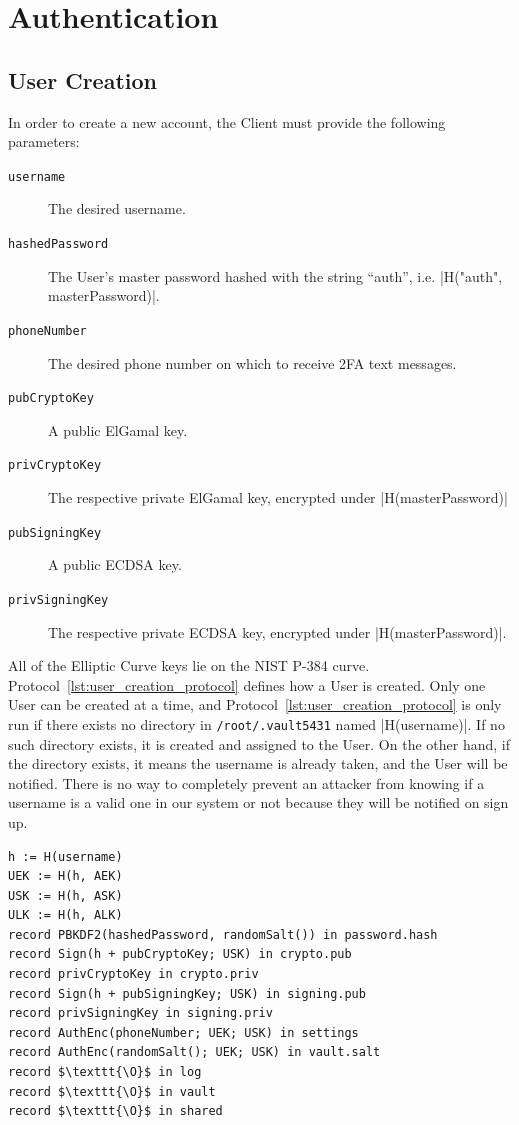 \documentclass{article}
\begin{document}
\section{Authentication}

\subsection{User Creation}
\label{sub:user_creation}
\par In order to create a new account, the Client must provide the following parameters:
\begin{description}
  \item[\texttt{username}] The desired username.
  \item[\texttt{hashedPassword}] The User's master password hashed with the string ``auth'', i.e. |H("auth", masterPassword)|.
  \item[\texttt{phoneNumber}] The desired phone number on which to receive 2FA text messages.
  \item[\texttt{pubCryptoKey}] A public ElGamal key.
  \item[\texttt{privCryptoKey}] The respective private ElGamal key, encrypted under |H(masterPassword)|
  \item[\texttt{pubSigningKey}] A public ECDSA key.
  \item[\texttt{privSigningKey}] The respective private ECDSA key, encrypted under |H(masterPassword)|.
\end{description}
\par All of the Elliptic Curve keys lie on the NIST P-384 curve. Protocol~\ref{lst:user_creation_protocol} defines how a User is created. Only one User can be created at a time, and Protocol~\ref{lst:user_creation_protocol} is only run if there exists no directory in \texttt{/root/.vault5431} named |H(username)|. If no such directory exists, it is created and assigned to the User. On the other hand, if the directory exists, it means the username is already taken, and the User will be notified. There is no way to completely prevent an attacker from knowing if a username is a valid one in our system or not because they will be notified on sign up.
\begin{lstlisting}[caption={User Creation Protocol},label={lst:user_creation_protocol},style=Pseudocode]
h := H(username)
UEK := H(h, AEK)
USK := H(h, ASK)
ULK := H(h, ALK)
record PBKDF2(hashedPassword, randomSalt()) in password.hash
record Sign(h + pubCryptoKey; USK) in crypto.pub
record privCryptoKey in crypto.priv
record Sign(h + pubSigningKey; USK) in signing.pub
record privSigningKey in signing.priv
record AuthEnc(phoneNumber; UEK; USK) in settings
record AuthEnc(randomSalt(); UEK; USK) in vault.salt
record $\texttt{\O}$ in log
record $\texttt{\O}$ in vault
record $\texttt{\O}$ in shared
\end{lstlisting}
\end{document}
